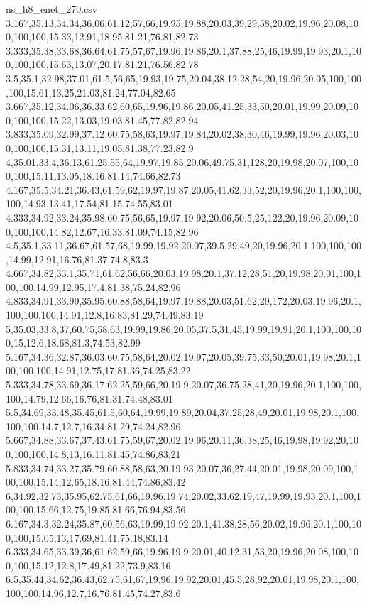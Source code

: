 \begin{filecontents*}[overwrite]{ns_h8_enet_270.csv}
3.167,35.13,34.34,36.06,61.12,57,66,19.95,19.88,20.03,39,29,58,20.02,19.96,20.08,100,100,100,15.33,12.91,18.95,81.21,76.81,82.73
3.333,35.38,33.68,36.64,61.75,57,67,19.96,19.86,20.1,37.88,25,46,19.99,19.93,20.1,100,100,100,15.63,13.07,20.17,81.21,76.56,82.78
3.5,35.1,32.98,37.01,61.5,56,65,19.93,19.75,20.04,38.12,28,54,20,19.96,20.05,100,100,100,15.61,13.25,21.03,81.24,77.04,82.65
3.667,35.12,34.06,36.33,62,60,65,19.96,19.86,20.05,41.25,33,50,20.01,19.99,20.09,100,100,100,15.22,13.03,19.03,81.45,77.82,82.94
3.833,35.09,32.99,37.12,60.75,58,63,19.97,19.84,20.02,38,30,46,19.99,19.96,20.03,100,100,100,15.31,13.11,19.05,81.38,77.23,82.9
4,35.01,33.4,36.13,61.25,55,64,19.97,19.85,20.06,49.75,31,128,20,19.98,20.07,100,100,100,15.11,13.05,18.16,81.14,74.66,82.73
4.167,35.5,34.21,36.43,61,59,62,19.97,19.87,20.05,41.62,33,52,20,19.96,20.1,100,100,100,14.93,13.41,17.54,81.15,74.55,83.01
4.333,34.92,33.24,35.98,60.75,56,65,19.97,19.92,20.06,50.5,25,122,20,19.96,20.09,100,100,100,14.82,12.67,16.33,81.09,74.15,82.96
4.5,35.1,33.11,36.67,61,57,68,19.99,19.92,20.07,39.5,29,49,20,19.96,20.1,100,100,100,14.99,12.91,16.76,81.37,74.8,83.3
4.667,34.82,33.1,35.71,61.62,56,66,20.03,19.98,20.1,37.12,28,51,20,19.98,20.01,100,100,100,14.99,12.95,17.4,81.38,75.24,82.96
4.833,34.91,33.99,35.95,60.88,58,64,19.97,19.88,20.03,51.62,29,172,20.03,19.96,20.1,100,100,100,14.91,12.8,16.83,81.29,74.49,83.19
5,35.03,33.8,37,60.75,58,63,19.99,19.86,20.05,37.5,31,45,19.99,19.91,20.1,100,100,100,15,12.6,18.68,81.3,74.53,82.99
5.167,34.36,32.87,36.03,60.75,58,64,20.02,19.97,20.05,39.75,33,50,20.01,19.98,20.1,100,100,100,14.91,12.75,17,81.36,74.25,83.22
5.333,34.78,33.69,36.17,62.25,59,66,20,19.9,20.07,36.75,28,41,20,19.96,20.1,100,100,100,14.79,12.66,16.76,81.31,74.48,83.01
5.5,34.69,33.48,35.45,61.5,60,64,19.99,19.89,20.04,37.25,28,49,20.01,19.98,20.1,100,100,100,14.7,12.7,16.34,81.29,74.24,82.96
5.667,34.88,33.67,37.43,61.75,59,67,20.02,19.96,20.11,36.38,25,46,19.98,19.92,20,100,100,100,14.8,13,16.11,81.45,74.86,83.21
5.833,34.74,33.27,35.79,60.88,58,63,20,19.93,20.07,36,27,44,20.01,19.98,20.09,100,100,100,15.14,12.65,18.16,81.44,74.86,83.42
6,34.92,32.73,35.95,62.75,61,66,19.96,19.74,20.02,33.62,19,47,19.99,19.93,20.1,100,100,100,15.66,12.75,19.85,81.66,76.94,83.56
6.167,34.3,32.24,35.87,60,56,63,19.99,19.92,20.1,41.38,28,56,20.02,19.96,20.1,100,100,100,15.05,13,17.69,81.41,75.18,83.14
6.333,34.65,33.39,36,61.62,59,66,19.96,19.9,20.01,40.12,31,53,20,19.96,20.08,100,100,100,15.12,12.8,17.49,81.22,73.9,83.16
6.5,35.44,34.62,36.43,62.75,61,67,19.96,19.92,20.01,45.5,28,92,20.01,19.98,20.1,100,100,100,14.96,12.7,16.76,81.45,74.27,83.6

\end{filecontents*}
